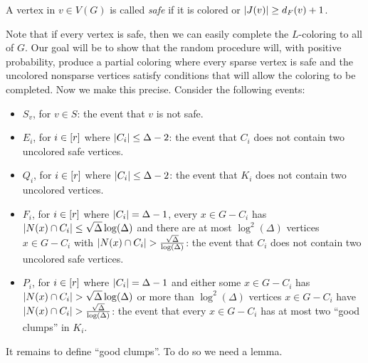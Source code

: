 \begin{defn}
A vertex in $v \in V(G)$ is called \emph{safe} if it is colored or $\left|J(v)\right|
\geq d_F(v) + 1$.
\end{defn}

Note that if every vertex is safe, then we can easily complete the $L$-coloring
to all of $G$.  Our goal will be to show that the random procedure will, with
positive probability, produce a partial coloring where every sparse vertex is
safe and the uncolored nonsparse vertices satisfy conditions that will allow the
coloring to be completed.  Now we make this precise.  Consider the following
events:

\begin{itemize}
  \item $S_v$, for $v \in S$: the event that $v$ is not safe.
  \item $E_i$, for $i \in \left[r\right]$ where $\left|C_i\right| \leq \Delta - 2$: the event that $C_i$ does not contain two uncolored safe vertices.
  \item $Q_i$, for $i \in \left[r\right]$ where $\left|C_i\right| \leq \Delta - 2$: the event that $K_i$ does not contain two uncolored vertices.
  \item $F_i$, for $i \in \left[r\right]$ where $\left|C_i\right| = \Delta - 1$, every $x
  \in G - C_i$ has $\left|N(x) \cap C_i\right| \leq \sqrt{\Delta}\log(\Delta)$ and
  there are at most $\log^2(\Delta)$ vertices $x \in G - C_i$ with $\left|N(x)
  \cap C_i\right| > \frac{\sqrt{\Delta}}{\log(\Delta)}$: the event that
  $C_i$ does not contain two uncolored safe vertices.
  \item $P_i$, for $i \in \left[r\right]$ where $\left|C_i\right| = \Delta - 1$ and either some $x \in G
  - C_i$ has $\left|N(x) \cap C_i\right| > \sqrt{\Delta}\log(\Delta)$ or more than
  $\log^2(\Delta)$ vertices $x \in G - C_i$ have $\left|N(x) \cap C_i\right| >
  \frac{\sqrt{\Delta}}{\log(\Delta)}$: the event that every $x \in G - C_i$ has
  at most two ``good clumps'' in $K_i$.
\end{itemize}

It remains to define ``good clumps''.  To do so we need a lemma.

